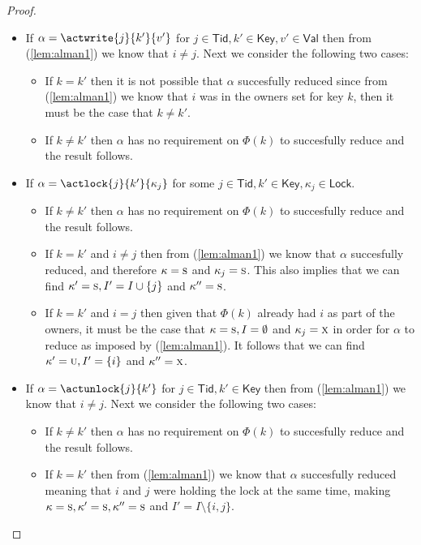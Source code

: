 \begin{lem}
\begin{proof}
\begin{itemize}
		\item If $\alpha = \actwrite{j}{k'}{v'}$ for $j \in \mathsf{Tid}, k' \in \mathsf{Key}, v' \in \mathsf{Val}$ then from (\ref{lem:alman1}) we know that $i \neq j$. Next we consider the following two cases:
			\begin{itemize}
				\item If $k = k'$ then it is not possible that $\alpha$ succesfully reduced since from (\ref{lem:alman1}) we know that $i$ was in the owners set for key $k$, then it must be the case that $k \neq k'$.
				\item If $k \neq k'$ then $\alpha$ has no requirement on $\Phi(k)$ to succesfully reduce and the result follows.
			\end{itemize}
			
		\item If $\alpha = \actlock{j}{k'}{\kappa_j}$ for some $j \in \mathsf{Tid}, k' \in \mathsf{Key}, \kappa_j \in \mathsf{Lock}$.
			\begin{itemize}
				\item If $k \neq k'$ then $\alpha$ has no requirement on $\Phi(k)$ to succesfully reduce and the result follows.
				\item If $k = k'$ and $i \neq j$ then from (\ref{lem:alman1}) we know that $\alpha$ succesfully reduced, and therefore $\kappa = \textsc{s}$ and $\kappa_j = \textsc{s}$. This also implies that we can find $\kappa' = \textsc{s}, I' = I \cup \{j\}$ and $\kappa'' = \textsc{s}$.
				\item If $k = k'$ and $i = j$ then given that $\Phi(k)$ already had $i$ as part of the owners, it must be the case that $\kappa = \textsc{s}, I = \emptyset$ and $\kappa_j = \textsc{x}$ in order for $\alpha$ to reduce as imposed by (\ref{lem:alman1}). It follows that we can find $\kappa' = \textsc{u}, I' = \{i\}$ and $\kappa'' = \textsc{x}$.
			\end{itemize}
			
		\item If $\alpha = \actunlock{j}{k'}$ for $j \in \mathsf{Tid}, k' \in \mathsf{Key}$ then from (\ref{lem:alman1}) we know that $i \neq j$. Next we consider the following two cases:
			\begin{itemize}
				\item If $k \neq k'$ then $\alpha$ has no requirement on $\Phi(k)$ to succesfully reduce and the result follows.
				\item If $k = k'$ then from (\ref{lem:alman1}) we know that $\alpha$ succesfully reduced meaning that $i$ and $j$ were holding the lock at the same time, making $\kappa = \textsc{s}, \kappa' = \textsc{s}, \kappa'' = \textsc{s}$ and $I' = I \setminus \{ i, j \}$.
			\end{itemize}
	\end{itemize}
	\end{proof}
\end{lem}

